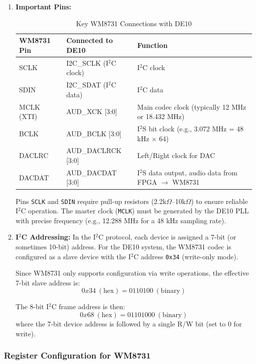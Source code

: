 \begin{enumerate}[label=\alph*)]
	\item \textbf{Important Pins:}
	\begin{table}[H]
		\centering
		\caption{Key WM8731 Connections with DE10}
		\label{tab:wm8731_pins}
		\begin{tabular}{|>{\centering\arraybackslash}m{2cm}
				|>{\centering\arraybackslash}m{6cm}
				|>{\centering\arraybackslash}m{8cm}|}
			\hline
			\textbf{WM8731 Pin} & \textbf{Connected to DE10} & \textbf{Function} \\ \hline
			SCLK   & I2C\_SCLK (I$^2$C clock)      & I$^2$C clock \\ \hline
			SDIN   & I2C\_SDAT (I$^2$C data)       & I$^2$C data \\ \hline
			MCLK (XTI) & AUD\_XCK {[3:0]}           & Main codec clock (typically 12 MHz or 18.432 MHz) \\ \hline
			BCLK   & AUD\_BCLK {[3:0]}             & I$^2$S bit clock (e.g., 3.072 MHz = 48 kHz $\times$ 64) \\ \hline
			DACLRC & AUD\_DACLRCK {[3:0]}          & Left/Right clock for DAC \\ \hline
			DACDAT & AUD\_DACDAT {[3:0]}           & I$^2$S data output, audio data from FPGA $\to$ WM8731 \\ \hline
		\end{tabular}
	\end{table}
	Pins \texttt{SCLK} and \texttt{SDIN} require pull-up resistors (2.2k$\Omega$–10k$\Omega$) to ensure reliable I$^2$C operation.  
	The master clock (\texttt{MCLK}) must be generated by the DE10 PLL with precise frequency (e.g., 12.288 MHz for a 48 kHz sampling rate).  
	
	\item \textbf{I$^2$C Addressing:}  
	In the I$^2$C protocol, each device is assigned a 7-bit (or sometimes 10-bit) address. For the DE10 system, the WM8731 codec is configured as a slave device with the I$^2$C address \texttt{0x34} (write-only mode).  
	
	Since WM8731 only supports configuration via write operations, the effective 7-bit slave address is:  
	\[
	0x34 \ (\text{hex}) = 0110100 \ (\text{binary})
	\]  
	
	The 8-bit I$^2$C frame address is then:  
	\[
	0x68 \ (\text{hex}) = 01101000 \ (\text{binary})
	\]  
	where the 7-bit device address is followed by a single R/W bit (set to 0 for write).
	
\end{enumerate}


\subsubsection{Register Configuration for WM8731}

